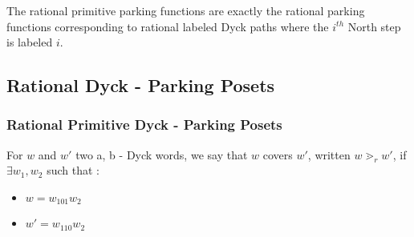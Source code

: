 \begin{rem}
    The rational primitive parking functions are exactly the
    rational parking functions corresponding to rational labeled
    Dyck paths where the $i^{th}$ North step is labeled $i$.
\end{rem}

\subsection{Rational Dyck - Parking Posets}

\subsubsection{Rational Primitive Dyck - Parking Posets}

\begin{definition}[$\gtrdot_r$]
    For $w$ and $w'$ two a, b - Dyck words, we say that $w$
    covers $w'$, written $w \gtrdot_r w'$, if
    $\exists w_1, w_2$ such that :
    \begin{itemize}
        \item $w = w_101w_2$
        \item $w' = w_110w_2$
    \end{itemize}  
\end{definition}

